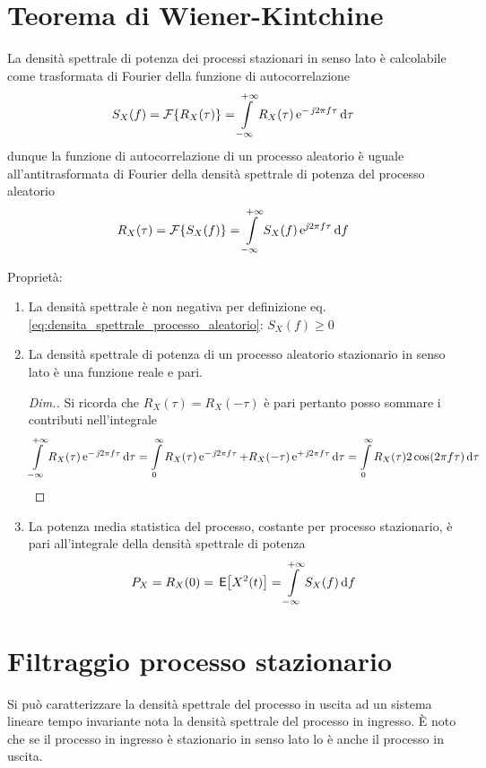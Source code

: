\section{Teorema di Wiener-Kintchine}
La densità spettrale di potenza dei processi stazionari in senso lato è calcolabile come trasformata di Fourier della funzione di autocorrelazione
\begin{equation}
	S_X(f)=\operatorname{\mathcal{F}}\!\left\lbrace{R_X(\tau)}\right\rbrace=\int\limits_{-\infty}^{+\infty}{R_X(\tau)\operatorname{e}^{-\operatorname{\mathit{j}\!} 2\pi f\tau}}{\,\mathop{}\!\mathrm{d}{\tau}}
\end{equation}
dunque la funzione di autocorrelazione di un processo aleatorio è uguale all'antitrasformata di Fourier della densità spettrale di potenza del processo aleatorio
\begin{equation}
	R_X(\tau)=\operatorname{\mathcal{F}}\!\left\lbrace{S_X(f)}\right\rbrace=\int\limits_{-\infty}^{+\infty}{S_X(f)\operatorname{e}^{\operatorname{\mathit{j}\!} 2\pi f\tau}}{\,\mathop{}\!\mathrm{d}{f}}
\end{equation}

Proprietà:
\begin{enumerate}
	\item La densità spettrale è non negativa per definizione eq.\ref{eq:densita_spettrale_processo_aleatorio}: $S_X(f)\geq 0$
	\item La densità spettrale di potenza di un processo aleatorio stazionario in senso lato è una funzione reale e pari.
\begin{proof}[Dim.]
Si ricorda che $R_X(\tau)=R_X(-\tau)$ è pari pertanto posso sommare i contributi nell'integrale
\[
	\int\limits_{-\infty}^{+\infty}{R_X(\tau)\operatorname{e}^{-\operatorname{\mathit{j}\!} 2\pi f\tau}}{\,\mathop{}\!\mathrm{d}{\tau}}=\int\limits_{0}^{\infty}{R_X(\tau)\operatorname{e}^{-\operatorname{\mathit{j}\!} 2\pi f\tau}+R_X(-\tau)\operatorname{e}^{+\operatorname{\mathit{j}\!} 2\pi f\tau}}{\,\mathop{}\!\mathrm{d}{\tau}}=\int\limits_{0}^{\infty}{R_X(\tau)2\,{\operatorname{cos}}^{}\!\left({2\pi f\tau}\right)}{\,\mathop{}\!\mathrm{d}{\tau}}
\]
\end{proof}
\item La potenza media statistica del processo, costante per processo stazionario, è pari all'integrale della densità spettrale di potenza
\begin{equation}
	P_X=R_X(0)=\,{\operatorname{\mathsf{E}}}\!\left[{X^2(t)}\right]=\int\limits_{-\infty}^{+\infty}{S_X(f)}{\,\mathop{}\!\mathrm{d}{f}}
\end{equation}
\end{enumerate}

\section{Filtraggio processo stazionario}
Si può caratterizzare la densità spettrale del processo in uscita ad un sistema lineare tempo invariante nota la densità spettrale del processo in ingresso.
\`E noto che se il processo in ingresso è stazionario in senso lato lo è anche il processo in uscita.

